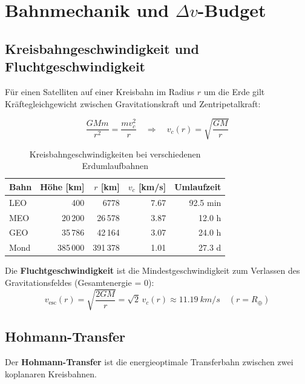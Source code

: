﻿\documentclass[12pt,a4paper]{article}
\begin{document}
\section{Bahnmechanik und $\Delta v$-Budget}

\subsection{Kreisbahngeschwindigkeit und Fluchtgeschwindigkeit}

Für einen Satelliten auf einer Kreisbahn im Radius $r$ um die Erde gilt
Kräftegleichgewicht zwischen Gravitationskraft und Zentripetalkraft:

\[
  \frac{GMm}{r^2} = \frac{mv_c^2}{r}
  \quad\Rightarrow\quad
  v_c(r) = \sqrt{\frac{GM}{r}}
\]

\begin{table}[H]
\centering
\caption{Kreisbahngeschwindigkeiten bei verschiedenen Erdumlaufbahnen}
\label{tab:bahnen}
\begin{tabular}{lrrrr}
\toprule
\textbf{Bahn} & \textbf{Höhe [km]} & \textbf{$r$ [km]} & \textbf{$v_c$ [km/s]} & \textbf{Umlaufzeit}\\
\midrule
LEO      & 400    & 6778   & 7.67 & 92.5 min\\
MEO      & 20\,200 & 26\,578 & 3.87 & 12.0 h\\
GEO      & 35\,786 & 42\,164 & 3.07 & 24.0 h\\
Mond     & 385\,000 & 391\,378 & 1.01 & 27.3 d\\
\bottomrule
\end{tabular}
\end{table}

Die \textbf{Fluchtgeschwindigkeit} ist die Mindestgeschwindigkeit zum Verlassen des
Gravitationsfeldes (Gesamtenergie = 0):
\[
  v_{\mathrm{esc}}(r) = \sqrt{\frac{2GM}{r}} = \sqrt{2}\,v_c(r)
  \approx \SI{11.19}{km/s} \quad (r = R_\oplus)
\]

\subsection{Hohmann-Transfer}

Der \textbf{Hohmann-Transfer} ist die energieoptimale Transferbahn zwischen zwei
koplanaren Kreisbahnen.
\end{document}

